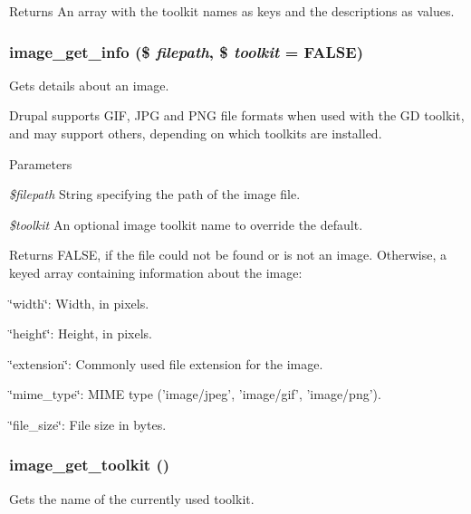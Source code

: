 \begin{DoxyReturn}{Returns}
An array with the toolkit names as keys and the descriptions as values. 
\end{DoxyReturn}
\hypertarget{group__image_ga7b2603b2b9d073cc4db9a6200aa9c2a4}{
\subsubsection[{image\_\-get\_\-info}]{\setlength{\rightskip}{0pt plus 5cm}image\_\-get\_\-info (\$ {\em filepath}, \/  \$ {\em toolkit} = {\ttfamily FALSE})}}
\label{group__image_ga7b2603b2b9d073cc4db9a6200aa9c2a4}
Gets details about an image.

Drupal supports GIF, JPG and PNG file formats when used with the GD toolkit, and may support others, depending on which toolkits are installed.


\begin{DoxyParams}{Parameters}
\item[{\em \$filepath}]String specifying the path of the image file. \item[{\em \$toolkit}]An optional image toolkit name to override the default.\end{DoxyParams}
\begin{DoxyReturn}{Returns}
FALSE, if the file could not be found or is not an image. Otherwise, a keyed array containing information about the image:
\begin{DoxyItemize}
\item \char`\"{}width\char`\"{}: Width, in pixels.
\item \char`\"{}height\char`\"{}: Height, in pixels.
\item \char`\"{}extension\char`\"{}: Commonly used file extension for the image.
\item \char`\"{}mime\_\-type\char`\"{}: MIME type ('image/jpeg', 'image/gif', 'image/png').
\item \char`\"{}file\_\-size\char`\"{}: File size in bytes. 
\end{DoxyItemize}
\end{DoxyReturn}
\hypertarget{group__image_ga08b3ce83f3526f248c1e08b4ee249a3a}{
\subsubsection[{image\_\-get\_\-toolkit}]{\setlength{\rightskip}{0pt plus 5cm}image\_\-get\_\-toolkit ()}}
\label{group__image_ga08b3ce83f3526f248c1e08b4ee249a3a}
Gets the name of the currently used toolkit.

